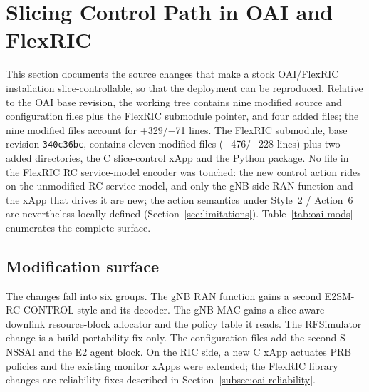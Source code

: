 \section{Slicing Control Path in OAI and FlexRIC}
\label{sec:oai}
This section documents the source changes that make a stock OAI/FlexRIC installation slice-controllable, so that the deployment can be reproduced. Relative to the OAI base revision, the working tree contains nine modified source and configuration files plus the FlexRIC submodule pointer, and four added files; the nine modified files account for +329/$-$71 lines. The FlexRIC submodule, base revision \texttt{340c36bc}, contains eleven modified files (+476/$-$228 lines) plus two added directories, the C slice-control xApp and the \systemname{} Python package. No file in the FlexRIC RC service-model encoder was touched: the new control action rides on the unmodified RC service model, and only the gNB-side RAN function and the xApp that drives it are new; the action semantics under Style~2 / Action~6 are nevertheless locally defined (Section~\ref{sec:limitations}). Table~\ref{tab:oai-mods} enumerates the complete surface.

\subsection{Modification surface}
The changes fall into six groups. The gNB RAN function gains a second E2SM-RC CONTROL style and its decoder. The gNB MAC gains a slice-aware downlink resource-block allocator and the policy table it reads. The RFSimulator change is a build-portability fix only. The configuration files add the second S-NSSAI and the E2 agent block. On the RIC side, a new C xApp actuates PRB policies and the existing monitor xApps were extended; the FlexRIC library changes are reliability fixes described in Section~\ref{subsec:oai-reliability}.

